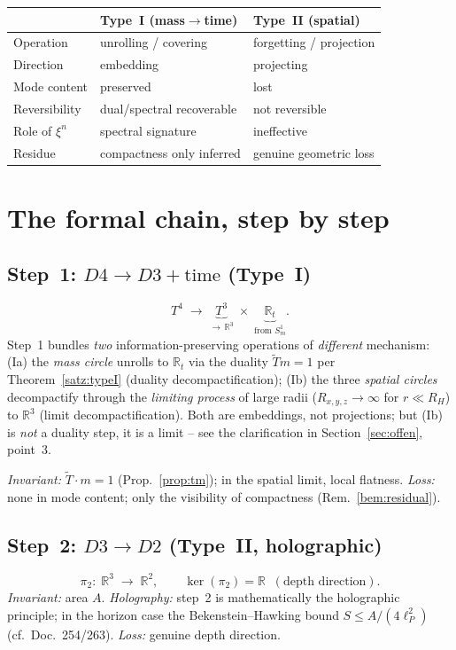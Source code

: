 \begin{center}
\begin{tabular}{lll}
\hline
 & \textbf{Type~I (mass$\to$time)} & \textbf{Type~II (spatial)} \\
\hline
Operation & unrolling / covering & forgetting / projection \\
Direction & embedding & projecting \\
Mode content & preserved & lost \\
Reversibility & dual/spectral recoverable & not reversible \\
Role of $\xi^n$ & spectral signature & ineffective \\
Residue & compactness only inferred & genuine geometric loss \\
\hline
\end{tabular}
\end{center}

\section{The formal chain, step by step}

\subsection{Step~1: $D4 \to D3 + \text{time}$ (Type~I)}
\[
  T^4 \;\longrightarrow\; \underbrace{T^3}_{\to\,\mathbb{R}^3}
  \;\times\; \underbrace{\mathbb{R}_t}_{\text{from } S^1_m}.
\]
Step~1 bundles \emph{two} information-preserving operations of \emph{different}
mechanism: (Ia) the \emph{mass circle} unrolls to $\mathbb{R}_t$ via the duality
$\tilde T m=1$ per Theorem~\ref{satz:typeI} (duality decompactification);
(Ib) the three \emph{spatial circles} decompactify through the \emph{limiting
process} of large radii ($R_{x,y,z}\to\infty$ for $r\ll R_H$) to $\mathbb{R}^3$
(limit decompactification). Both are embeddings, not projections; but (Ib) is
\emph{not} a duality step, it is a limit -- see the clarification in
Section~\ref{sec:offen}, point~3.

\textit{Invariant:} $\tilde{T}\cdot m = 1$ (Prop.~\ref{prop:tm}); in the spatial
limit, local flatness.\quad
\textit{Loss:} none in mode content; only the visibility of compactness
(Rem.~\ref{bem:residual}).

\subsection{Step~2: $D3 \to D2$ (Type~II, holographic)}
\[
  \pi_2:\; \mathbb{R}^3 \;\longrightarrow\; \mathbb{R}^2,
  \qquad \ker(\pi_2) = \mathbb{R}\;\;(\text{depth direction}).
\]
\textit{Invariant:} area $A$.\quad
\textit{Holography:} step~2 is mathematically the holographic principle; in the
horizon case the Bekenstein--Hawking bound $S \le A/(4\ell_P^2)$ (cf.\
Doc.~254/263).\quad
\textit{Loss:} genuine depth direction.

